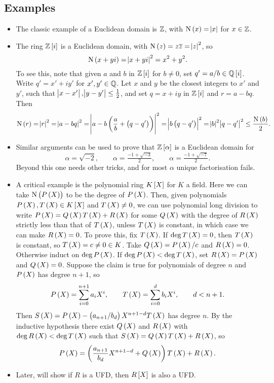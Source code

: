 \subsection{Examples}

\begin{example*}
\hfill
\begin{itemize}
\item The classic example of a Euclidean domain is $ \mathbb{Z} $, with $ \N\br{x} = \abs{x} $ for $ x \in \mathbb{Z} $.
\item The ring $ \ZZ\sbr{i} $ is a Euclidean domain, with $ \N\br{z} = z\overline{z} = \abs{z}^2 $, so
$$ \N\br{x + yi} = \abs{x + yi}^2 = x^2 + y^2. $$
To see this, note that given $ a $ and $ b $ in $ \ZZ\sbr{i} $ for $ b \ne 0 $, set $ q' = a / b \in \QQ\sbr{i} $. Write $ q' = x' + iy' $ for $ x', y' \in \mathbb{Q} $. Let $ x $ and $ y $ be the closest integers to $ x' $ and $ y' $, such that $ \abs{x - x'}, \abs{y - y'} \le \tfrac{1}{2} $, and set $ q = x + iy $ in $ \ZZ\sbr{i} $ and $ r = a - bq $. Then
$$ \N\br{r} = \abs{r}^2 = \abs{a - bq}^2 = \abs{a - b\br{\dfrac{a}{b} + \br{q - q'}}}^2 = \abs{b\br{q - q'}}^2 = \abs{b}^2\abs{q - q'}^2 \le \dfrac{\N\br{b}}{2}. $$
\item Similar arguments can be used to prove that $ \ZZ\sbr{\alpha} $ is a Euclidean domain for
$$ \alpha = \sqrt{-2}, \qquad \alpha = \tfrac{-1 + \sqrt{-3}}{2}, \qquad \alpha = \tfrac{-1 + \sqrt{-7}}{2}. $$
Beyond this one needs other tricks, and for most $ \alpha $ unique factorisation fails.
\item A critical example is the polynomial ring $ K\sbr{X} $ for $ K $ a field. Here we can take $ \N\br{P\br{X}} $ to be the degree of $ P\br{X} $. Then, given polynomials $ P\br{X}, T\br{X} \in K\sbr{X} $ and $ T\br{X} \ne 0 $, we can use polynomial long division to write $ P\br{X} = Q\br{X}T\br{X} + R\br{X} $ for some $ Q\br{X} $ with the degree of $ R\br{X} $ strictly less than that of $ T\br{X} $, unless $ T\br{X} $ is constant, in which case we can make $ R\br{X} = 0 $. To prove this, fix $ T\br{X} $. If $ \deg T\br{X} = 0 $, then $ T\br{X} $ is constant, so $ T\br{X} = c \ne 0 \in K $. Take $ Q\br{X} = P\br{X} / c $ and $ R\br{X} = 0 $. Otherwise induct on $ \deg P\br{X} $. If $ \deg P\br{X} < \deg T\br{X} $, set $ R\br{X} = P\br{X} $ and $ Q\br{X} = 0 $. Suppose the claim is true for polynomials of degree $ n $ and $ P\br{X} $ has degree $ n + 1 $, so
$$ P\br{X} = \sum_{i = 0}^{n + 1} a_iX^i, \qquad T\br{X} = \sum_{i = 0}^d b_iX^i, \qquad d < n + 1. $$
Then $ S\br{X} = P\br{X} - \br{a_{n + 1} / b_d}X^{n + 1 - d}T\br{X} $ has degree $ n $. By the inductive hypothesis there exist $ Q\br{X} $ and $ R\br{X} $ with $ \deg R\br{X} < \deg T\br{X} $ such that $ S\br{X} = Q\br{X}T\br{X} + R\br{X} $, so
$$ P\br{X} = \br{\dfrac{a_{n + 1}}{b_d}X^{n + 1 - d} + Q\br{X}}T\br{X} + R\br{X}. $$
\item Later, will show if $ R $ is a UFD, then $ R\sbr{X} $ is also a UFD.
\end{itemize}
\end{example*}

